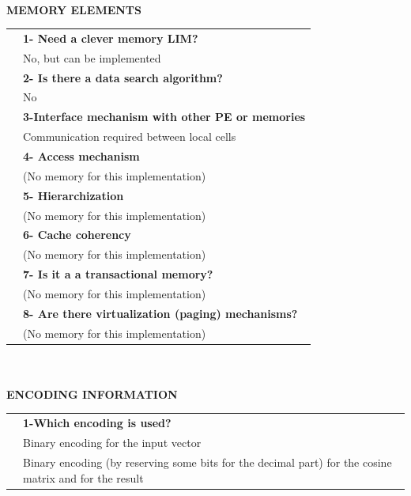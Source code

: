    \newpage{\large \textbf{\qquad }}\vspace{10pt}\\
   {\large \textbf{MEMORY ELEMENTS}}\vspace{10pt}\\\begin{tabular}{ p{0.2cm} p{14.5cm}}
   	&\textbf{1- Need a clever memory LIM?}\\
   	&	No, but can be implemented\vspace{7pt}\\
   	&\textbf{2- Is there a data search algorithm?}\\
   	&	No\vspace{7pt}\\
   	&\textbf{	3-Interface mechanism with other PE or memories}\\
   	&	Communication required between local cells\vspace{7pt}\\
   	&	\textbf{4- Access mechanism}\\
   	&	(No memory for this implementation)\vspace{7pt}\\
   	&	\textbf{5- Hierarchization} \\
   	&	(No memory for this implementation)\vspace{7pt}\\
   	&\textbf{	6- Cache coherency} \\
   	&	(No memory for this implementation)\vspace{7pt}\\
   	&\textbf{	7- Is it a a transactional memory?}\\
   	&	(No memory for this implementation)\vspace{7pt}\\
   	&\textbf{	8- Are there virtualization (paging) mechanisms?}\\
   	&	(No memory for this implementation)\end{tabular}\vspace{14pt}\\
   \vspace{10pt}\\
   {\large\textbf{ENCODING INFORMATION}}\vspace{10pt}\\
   \begin{tabular}{ p{0.2cm} p{14.5cm}}
   	&\textbf{1-Which encoding is used?}\\
   	&Binary encoding for the input vector\\
&Binary encoding (by reserving some bits for the decimal part) for the cosine matrix and for the result\\
   \end{tabular}
